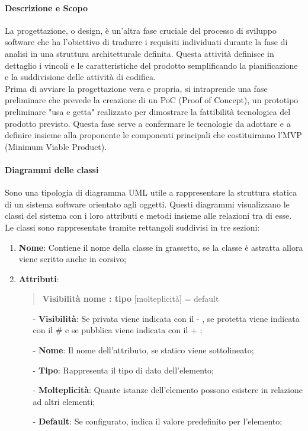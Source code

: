 \documentclass[10pt]{article}
\begin{document}
\begin{justify}
        \paragraph{Descrizione e Scopo}     
        La progettazione, o design, è un'altra fase cruciale del processo di sviluppo software che ha l'obiettivo di tradurre i requisiti individuati durante la fase di analisi in una struttura architetturale definita. Questa attività definisce in dettaglio i vincoli e le caratteristiche del prodotto semplificando la pianificazione e la suddivisione delle attività di codifica.\\
        Prima di avviare la progettazione vera e propria, si intraprende una fase preliminare che prevede la creazione di un PoC (Proof of Concept), un prototipo preliminare "usa e getta" realizzato per dimostrare la fattibilità tecnologica del prodotto previsto. Questa fase serve a confermare le tecnologie da adottare e a definire insieme alla proponente le componenti principali che costituiranno l'MVP (Minimum Viable Product).\\
    
        \paragraph{Diagrammi delle classi}
        Sono una tipologia di diagramma UML utile a rappresentare la struttura statica di un sistema software orientato agli oggetti. Questi diagrammi visualizzano le classi del sistema con i loro attributi e metodi insieme alle relazioni tra di esse.\\
        Le classi sono rappresentate tramite rettangoli suddivisi in tre sezioni: 
        \begin{enumerate}
            \item \textbf{Nome}: Contiene il nome della classe in grassetto, se la classe è astratta allora viene scritto anche in corsivo;
            \item \textbf{Attributi}:
            \begin{quote}
                \textbf{Visibilità nome : tipo} [molteplicità] = default
            \end{quote}
            \begin{itemize}
                \item [-] \textbf{Visibilità}: Se privata viene indicata con il - , se protetta viene indicata con il \# e se pubblica viene indicata con il + ;
                \item [-] \textbf{Nome}: Il nome dell’attributo, se statico viene sottolineato;
                \item [-] \textbf{Tipo}: Rappresenta il tipo di dato dell’elemento;
                \item [-] \textbf{Molteplicità}: Quante istanze dell’elemento possono esistere in relazione ad altri elementi;
                \item [-] \textbf{Default}: Se configurato, indica il valore predefinito per l’elemento;
            \end{itemize}
        

\end{enumerate}
\end{justify}
\end{document}
